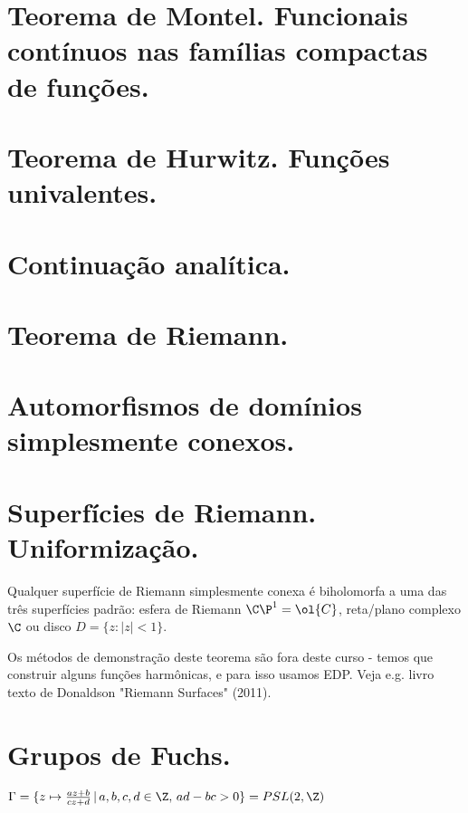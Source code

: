 



\section{Teorema de Montel. Funcionais contínuos nas famílias compactas de funções.}

\section{Teorema de Hurwitz. Funções univalentes.}

\section{Continuação analítica.}

\section{Teorema de Riemann.}

\section{Automorfismos de domínios simplesmente conexos.}

\section{Superfícies de Riemann. Uniformização.}

\begin{teorema}
Qualquer superfície de Riemann simplesmente conexa é biholomorfa a uma das três superfícies padrão:
esfera de Riemann $\C\P^1 = \ol{C}$, reta/plano complexo $\C$ ou disco $D = \{z : |z|<1\}$.
\end{teorema}
Os métodos de demonstração deste teorema são fora deste curso - temos que construir alguns funções
harmônicas, e para isso usamos EDP. Veja e.g. livro texto de Donaldson "Riemann Surfaces" (2011).

\section{Grupos de Fuchs.}

\begin{exem}
$\Gamma = \{ z \mapsto \frac{az+b}{cz+d} \,|\, a,b,c,d\in\Z, \, ad-bc>0 \} = PSL(2,\Z)$
\end{exem}

